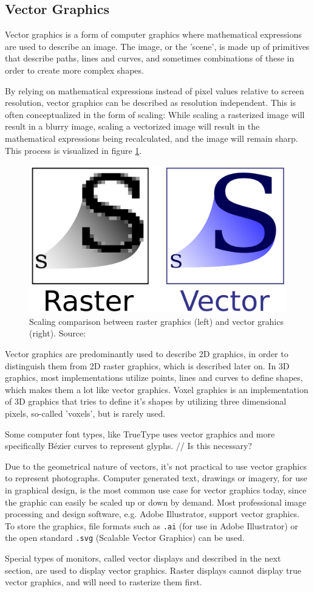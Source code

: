 \subsection{Vector Graphics}
Vector graphics is a form of computer graphics where mathematical expressions are used to describe an image. The image, or the 'scene', is made up of primitives that describe paths, lines and curves, and sometimes combinations of these in order to create more complex shapes.

By relying on mathematical expressions instead of pixel values relative to screen resolution, vector graphics can be described as resolution independent. This is often conceptualized in the form of scaling: While scaling a rasterized image will result in a blurry image, scaling a vectorized image will result in the mathematical expressions being recalculated, and the image will remain sharp. This process is visualized in figure \ref{fig:vectorscaling}.

\begin{figure}[h!]
\centering \includegraphics[width=0.5\linewidth]{images/bm_vs_svg.png}
\caption{Scaling comparison between raster graphics (left) and vector grahics (right). Source: \cite{svg}}
\label{fig:vectorscaling}
\end{figure}

Vector graphics are predominantly used to describe 2D graphics, in order to distinguish them from 2D raster graphics, which is described later on. In 3D graphics, most implementations utilize points, lines and curves to define shapes, which makes them a lot like vector graphics. Voxel graphics is an implementation of 3D graphics that tries to define it's shapes by utilizing three dimensional pixels, so-called 'voxels', but is rarely used.

Some computer font types, like TrueType uses vector graphics and more specifically Bézier curves to represent glyphs\cite{truetype}. // Is this necessary?

Due to the geometrical nature of vectors, it's not practical to use vector graphics to represent photographs. Computer generated text, drawings or imagery, for use in graphical design, is the most common use case for vector graphics today, since the graphic can easily be scaled up or down by demand. Most professional image processing and design software, e.g. Adobe Illustrator, support vector graphics. To store the graphics, file formats such as \texttt{.ai} (for use in Adobe Illustrator) or the open standard \texttt{.svg} (Scalable Vector Graphics) can be used.

Special types of monitors, called vector displays and described in the next section, are used to display vector graphics. Raster displays cannot display true vector graphics, and will need to rasterize them first.

